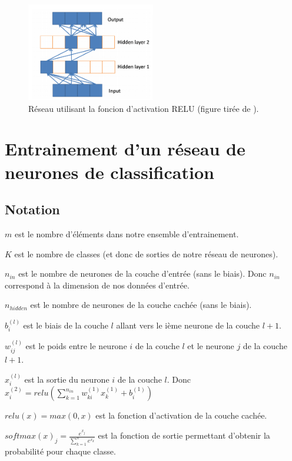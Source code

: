 \documentclass[a4paper,11pt,oneside,roman]{article}
\begin{document}
    \begin{figure}
        \centering
        \includegraphics[width=0.5\textwidth]{imgs/sparsity.png}
        \caption{Réseau utilisant la foncion d'activation RELU (figure tirée de \cite{pmlr-v15-glorot11a}).}
        \label{fig_sparsity}
    \end{figure}

    \section{Entrainement d'un réseau de neurones de classification}
    \subsection{Notation}
    $m$ est le nombre d'éléments dans notre ensemble d'entrainement.

    $K$ est le nombre de classes (et donc de sorties de notre réseau de neurones).

    $n_{in}$ est le nombre de neurones de la couche d'entrée (sans le biais). Donc $n_{in}$ correspond à la dimension de nos données d'entrée.
    
    $n_{hidden}$ est le nombre de neurones de la couche cachée (sans le biais).
        
    $b_i^{(l)}$ est le biais de la couche $l$ allant vers le ième neurone de la couche $l+1$.

    $w_{ij}^{(l)}$ est le poids entre le neurone $i$ de la couche $l$ et le neurone $j$ de la couche $l+1$.
    
    $x_{i}^{(l)}$ est la sortie du neurone $i$ de la couche $l$. Donc $x_{i}^{(2)} = relu(\sum\limits_{k=1}^{n_{in}} w_{ki}^{(1)}x_{k}^{(1)} + b_i^{(1)})$
    
    $relu(x) = max(0,x)$ est la fonction d'activation de la couche cachée.

    $softmax(x)_j = \frac{e^{x_j}}{\sum\limits_{k=1}^n e^{x_k}}$ est la fonction de sortie permettant d'obtenir la probabilité pour chaque classe.
\end{document}
